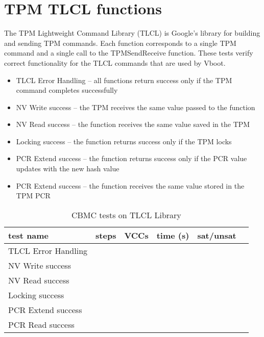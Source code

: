 \section{TPM TLCL functions}

The TPM Lightweight Command Library (TLCL) is Google's library for building and sending TPM commands.
Each function corresponds to a single TPM command and a single call to the TPMSendReceive function.
These tests verify correct functionality for the TLCL commands that are used by Vboot. 

\begin{itemize}
   \item TLCL Error Handling --  all functions return success only if the TPM command completes successfully
   \item NV Write success -- the TPM receives the same value passed to the function
   \item NV Read success --  the function receives the same value saved in the TPM
   \item Locking success --  the function returns success only if the TPM locks
   \item PCR Extend success --  the function returns success only if the PCR value updates with the new hash value
   \item PCR Extend success --  the function receives the same value stored in the TPM PCR

\end{itemize}

\begin{table}[!htbp]
    \centering
    \caption{CBMC tests on TLCL Library}\label{TLCL_results}
    \begin{tabular}{llllll}
        \toprule
        test name & steps & VCCs & time (s) & sat/unsat  \\ \bottomrule
        TLCL Error Handling& & & & \\
        NV Write success&  &  & & \\
        NV Read success&  &  & & \\
        Locking success&  &  & & \\
        PCR Extend success&  &  & & \\
        PCR Read success&  &  & & \\\bottomrule
    \end{tabular}
\end{table}

